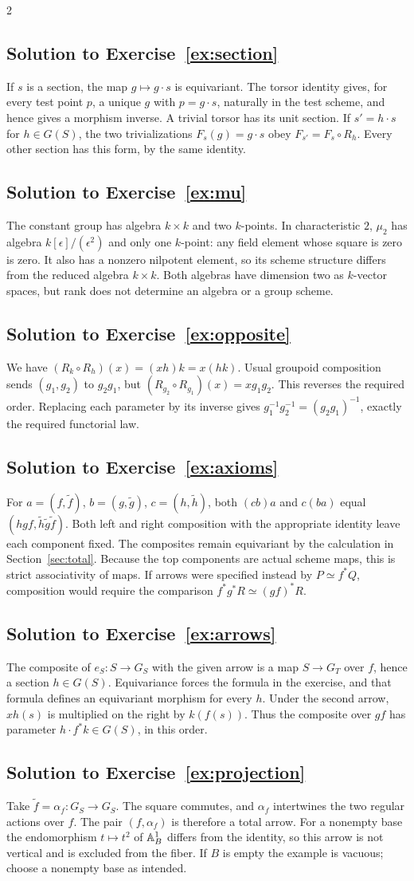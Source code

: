 \documentclass[12pt]{memoir}
\newcommand{\BGsolution}[1]{\subsection*{Solution to Exercise~\ref{#1}}\label{sol:#1}}
\begin{document}
\begin{multicols}{2}
\BGsolution{ex:section}
If $s$ is a section, the map $g\mapsto g\cdot s$ is equivariant. The
torsor identity gives, for every test point $p$, a unique $g$ with
$p=g\cdot s$, naturally in the test scheme, and hence gives a morphism
inverse. A trivial torsor has its unit section. If $s'=h\cdot s$ for
$h\in G(S)$, the two trivializations $F_s(g)=g\cdot s$ obey
$F_{s'}=F_s\circ R_h$. Every other section has this form, by the same
identity.

\BGsolution{ex:mu}
The constant group has algebra $k\times k$ and two $k$-points.
In characteristic $2$, $\mu_2$ has algebra
$k[\epsilon]/(\epsilon^2)$ and only one $k$-point: any field element
whose square is zero is zero. It also has a nonzero nilpotent element,
so its scheme structure differs from the reduced algebra $k\times k$.
Both algebras have dimension two as $k$-vector spaces, but rank does not
determine an algebra or a group scheme.

\BGsolution{ex:opposite}
We have $(R_k\circ R_h)(x)=(xh)k=x(hk)$.
Usual groupoid composition sends $(g_1,g_2)$ to $g_2g_1$, but
$(R_{g_2}\circ R_{g_1})(x)=xg_1g_2$. This reverses the required order.
Replacing each parameter by its inverse gives
$g_1^{-1}g_2^{-1}=(g_2g_1)^{-1}$, exactly the required functorial law.

\BGsolution{ex:axioms}
For $a=(f,\widetilde f)$, $b=(g,\widetilde g)$,
$c=(h,\widetilde h)$, both $(cb)a$ and $c(ba)$ equal
$(hgf,\widetilde h\widetilde g\widetilde f)$. Both left and right
composition with the appropriate identity leave each component fixed.
The composites remain equivariant by the calculation in
Section~\ref{sec:total}. Because the top components are actual scheme
maps, this is strict associativity of maps. If arrows were specified
instead by $P\simeq f^*Q$, composition would require the comparison
$f^*g^*R\simeq(gf)^*R$.

\BGsolution{ex:arrows}
The composite of $e_S:S\to G_S$ with the given arrow is a map $S\to G_T$
over $f$, hence a section $h\in G(S)$. Equivariance forces the formula
in the exercise, and that formula defines an equivariant morphism for
every $h$. Under the second arrow, $xh(s)$ is multiplied on the right
by $k(f(s))$. Thus the composite over $gf$ has parameter
$h\cdot f^*k\in G(S)$, in this order.

\BGsolution{ex:projection}
Take $\widetilde f=\alpha_f:G_S\to G_S$. The square commutes, and
$\alpha_f$ intertwines the two regular actions over $f$. The pair
$(f,\alpha_f)$ is therefore a total arrow. For a nonempty base the
endomorphism $t\mapsto t^2$ of $\mathbb{A}^1_B$ differs from the identity,
so this arrow is not vertical and is excluded from the fiber. If $B$
is empty the example is vacuous; choose a nonempty base as intended.


\end{multicols}
\end{document}
